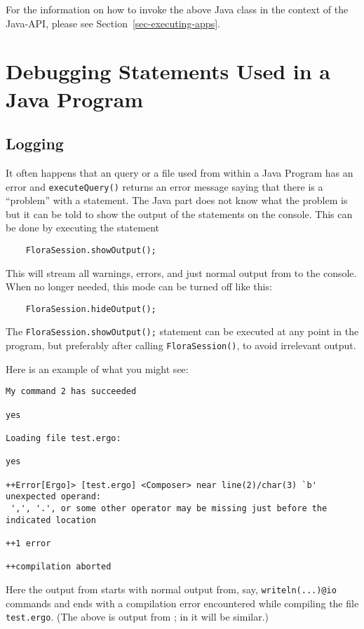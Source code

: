  For the information on how to invoke the above Java class in the context
 of the Java-\FLSYSTEM API,
 please see Section~\ref{sec-executing-apps}.

\section{Debugging \FLSYSTEM Statements Used in a Java Program}

\subsection{Logging}

It often happens that an \FLSYSTEM query or a file used from within a Java
Program has an error and \texttt{executeQuery()} returns an error message
saying that there is a ``problem'' with a \FLSYSTEM statement.
The Java part does not know what the problem is but it can be told to show
the output of the \FLSYSTEM statements on the console. This can be done by
executing the statement
\begin{verbatim}
    FloraSession.showOutput();
\end{verbatim}
This will stream all warnings, errors, and just normal output from
\FLSYSTEM to the console.
When no longer needed, this mode can be turned off like this:
\begin{verbatim}
    FloraSession.hideOutput();
\end{verbatim}
The \texttt{FloraSession.showOutput();} statement can be executed at any
point in the program, but preferably after calling \texttt{FloraSession()},
to avoid irrelevant output.

Here is an example of what you might see:
\begin{verbatim}
My command 2 has succeeded

yes

Loading file test.ergo:

yes

++Error[Ergo]> [test.ergo] <Composer> near line(2)/char(3) `b' unexpected operand:
 ',', '.', or some other operator may be missing just before the indicated location

++1 error

++compilation aborted
\end{verbatim}
Here the output from \FLSYSTEM starts with normal output from, say,
\texttt{writeln(...)@\bs{}io} commands and ends with a compilation error
encountered while compiling the file \texttt{test.ergo}.  
(The above is output from \ERGO; in \FLORA it will be similar.)

